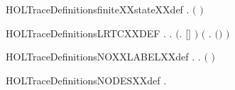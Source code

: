 \newcommand{\HOLTraceDate}{04 Settembre 2019}
\newcommand{\HOLTraceTime}{15:57}
\begin{SaveVerbatim}{HOLTraceDefinitionsfiniteXXstateXXdef}
\HOLTokenTurnstile{} \HOLSymConst{\HOLTokenForall{}}.   \HOLSymConst{\HOLTokenEquiv{}}  \ensuremath{(} \ensuremath{)}
\end{SaveVerbatim}
\newcommand{\HOLTraceDefinitionsfiniteXXstateXXdef}{\UseVerbatim{HOLTraceDefinitionsfiniteXXstateXXdef}}
\begin{SaveVerbatim}{HOLTraceDefinitionsLRTCXXDEF}
\HOLTokenTurnstile{} \HOLSymConst{\HOLTokenForall{}}   .
            \HOLSymConst{\HOLTokenEquiv{}}
       \HOLSymConst{\HOLTokenForall{}}.
           \ensuremath{(}\HOLSymConst{\HOLTokenForall{}}.   \ensuremath{[}\ensuremath{]} \ensuremath{)} \HOLSymConst{\HOLTokenConj{}}
           \ensuremath{(}\HOLSymConst{\HOLTokenForall{}}    .     \HOLSymConst{\HOLTokenConj{}}     \HOLSymConst{\HOLTokenImp{}}   \ensuremath{(}\HOLSymConst{::}\ensuremath{)} \ensuremath{)} \HOLSymConst{\HOLTokenImp{}}
              
\end{SaveVerbatim}
\newcommand{\HOLTraceDefinitionsLRTCXXDEF}{\UseVerbatim{HOLTraceDefinitionsLRTCXXDEF}}
\begin{SaveVerbatim}{HOLTraceDefinitionsNOXXLABELXXdef}
\HOLTokenTurnstile{} \HOLSymConst{\HOLTokenForall{}}.   \HOLSymConst{\HOLTokenEquiv{}} \HOLSymConst{\HOLTokenNeg{}}\HOLSymConst{\HOLTokenExists{}}.  \ensuremath{(} \ensuremath{)} 
\end{SaveVerbatim}
\newcommand{\HOLTraceDefinitionsNOXXLABELXXdef}{\UseVerbatim{HOLTraceDefinitionsNOXXLABELXXdef}}
\begin{SaveVerbatim}{HOLTraceDefinitionsNODESXXdef}
\HOLTokenTurnstile{} \HOLSymConst{\HOLTokenForall{}}.   \HOLSymConst{\ensuremath{=}} \HOLTokenLeftbrace{} \HOLTokenBar{}   \HOLTokenRightbrace{}
\end{SaveVerbatim}
